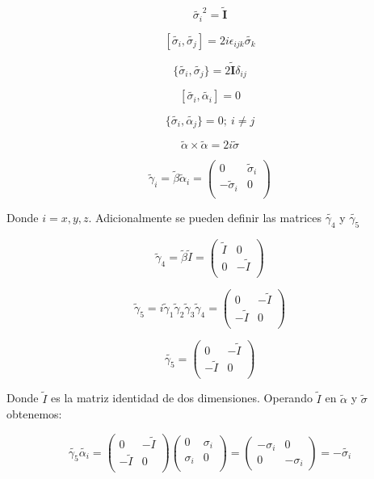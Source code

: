 \documentclass[a4paper, 12pt]{article} %
\begin{document}
\[
\widetilde{\sigma_i}^2 = \widetilde{\mathbf{I}}
\]

\[
[\widetilde{\sigma_i}, \widetilde{\sigma_j}] = 2i\epsilon_{ijk}\widetilde{\sigma_k}
\]

\[
\{\widetilde{\sigma_i},\widetilde{\sigma_j}\} = 2\widetilde{\mathbf{I}}\delta_{ij}
\]

\[
[\widetilde{\sigma_i}, \widetilde{\alpha_i}] = 0
\]

\[
\{ \widetilde{\sigma_i}, \widetilde{\alpha_j} \} = 0;  \ i \neq j
\]

\[
\widetilde{\alpha} \times \widetilde{\alpha} = 2i\widetilde{\sigma}
\]

\[
\widetilde{\gamma}_i = \widetilde{\beta}\widetilde{\alpha}_i = 
\begin{pmatrix}
0 & \widetilde{\sigma}_i \\
-\widetilde{\sigma}_i & 0 \\
\end{pmatrix}
\]

Donde $i = x, y, z$. Adicionalmente se pueden definir las matrices $\widetilde{\gamma_4}$ y $\widetilde{\gamma_5}$


\[
\widetilde{\gamma}_4 = \widetilde{\beta}\widetilde{I} = 
\begin{pmatrix}
\widetilde{I} & 0 \\
0 & -\widetilde{I}  \\
\end{pmatrix}
\]

\begin{equation}\label{eq:gamma5}
\widetilde{\gamma}_5 = i\widetilde{\gamma}_1 \widetilde{\gamma}_2 \widetilde{\gamma}_3 \widetilde{\gamma}_4 = 
\begin{pmatrix}
0 & -\widetilde{I} \\
-\widetilde{I} & 0 \\
\end{pmatrix}
\end{equation}


\[
\widetilde{\gamma_5} = 
\begin{pmatrix} 
0 & - \widetilde{I} \\
-\widetilde{I} & 0 \\
\end{pmatrix}
\]

Donde $\widetilde{I}$ es la matriz identidad de dos dimensiones. Operando  $\widetilde{I}$ 
en $\widetilde{\alpha}$ y $\widetilde{\sigma}$ obtenemos:

\[
\widetilde{\gamma_5}\widetilde{\alpha_i} = 
\begin{pmatrix} 
0 & - \widetilde{I} \\
-\widetilde{I} & 0 \\
\end{pmatrix} 
\begin{pmatrix} 
0 & \sigma_i \\
\sigma_i & 0 \\
\end{pmatrix} 
= 
\begin{pmatrix}
-\sigma_i & 0 \\
0 & -\sigma_i
\end{pmatrix}
= -\widetilde{\sigma_i}
\]
\end{document}

